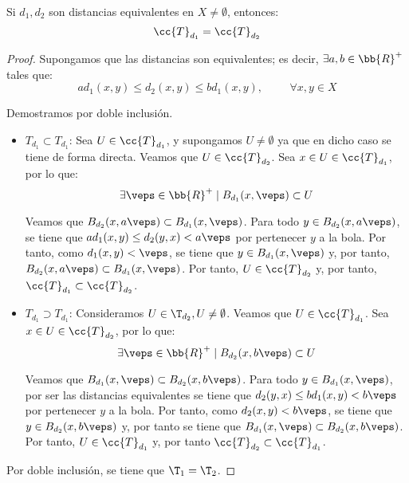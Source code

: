 \begin{prop}
    Si $d_1, d_2$ son distancias equivalentes en $X\neq \emptyset$, entonces:
    $$\cc{T}_{d_1}=\cc{T}_{d_2}$$
\end{prop}
\begin{proof}
    Supongamos que las distancias son equivalentes; es decir, $\exists a,b\in \bb{R}^+$ tales que:
    \begin{equation*}
         ad_1(x,y) \leq d_2(x,y)\leq bd_1(x,y),\hspace{1cm} \forall x,y\in X
    \end{equation*}

    Demostramos por doble inclusión.
    \begin{itemize}
        \item  \ul{$T_{d_1}\subset T_{d_1}$}: Sea $U\in \cc{T}_{d_1}$, y supongamos $U\neq \emptyset$ ya que en dicho caso se tiene de forma directa. Veamos que $U\in \cc{T}_{d_2}$. Sea $x\in U\in \cc{T}_{d_1}$, por lo que:
        \begin{equation*}
            \exists \veps\in \bb{R}^+\mid B_{d_1}(x,\veps)\subset U
        \end{equation*}
    
        Veamos que $B_{d_2}(x,a\veps)\subset B_{d_1}(x,\veps)$. Para todo $y\in B_{d_2}(x,a\veps)$, se tiene que $ad_1(x,y)\leq d_2(y,x)< a\veps$ por pertenecer $y$ a la bola. Por tanto, como $d_1(x,y)< \veps$, se tiene que $y\in B_{d_1}(x,\veps)$ y, por tanto, $B_{d_2}(x,a\veps)\subset B_{d_1}(x,\veps)$. Por tanto, $U\in \cc{T}_{d_2}$ y, por tanto, $\cc{T}_{d_1}\subset \cc{T}_{d_2}$.

        \item  \ul{$T_{d_1}\supset T_{d_1}$}: Consideramos $U\in \T_{d_2}, U\neq \emptyset$. Veamos que $U\in \cc{T}_{d_1}$. Sea $x\in U\in \cc{T}_{d_2}$, por lo que:
        \begin{equation*}
            \exists \veps\in \bb{R}^+\mid B_{d_2}(x,b\veps)\subset U
        \end{equation*}
    
        Veamos que $B_{d_1}(x,\veps)\subset B_{d_2}(x,b\veps)$. Para todo $y\in B_{d_1}(x,\veps)$, por ser las distancias equivalentes se tiene que $d_2(y,x)\leq bd_1(x,y)<b\veps$ por pertenecer $y$ a la bola. Por tanto, como $d_2(x,y)< b\veps$, se tiene que $y\in B_{d_2}(x,b\veps)$ y, por tanto se tiene que $B_{d_1}(x,\veps)\subset B_{d_2}(x,b\veps)$. Por tanto, $U\in \cc{T}_{d_1}$ y, por tanto $\cc{T}_{d_2}\subset \cc{T}_{d_1}$.
    \end{itemize}

    Por doble inclusión, se tiene que $\T_1=\T_2$.
\end{proof}

